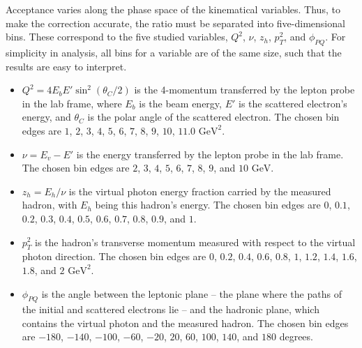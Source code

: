     Acceptance varies along the phase space of the kinematical variables.
    Thus, to make the correction accurate, the ratio must be separated into five-dimensional bins.
    These correspond to the five studied variables, $Q^2$, $\nu$, $z_h$, $p_T^2$, and $\phi_{PQ}$.
    For simplicity in analysis, all bins for a variable are of the same size, such that the results are easy to interpret.
    \begin{itemize}
        \item
            $Q^2 = 4E_bE'\sin^2(\theta_C/2)$ is the 4-momentum transferred by the lepton probe in the lab frame, where $E_b$ is the beam energy, $E'$ is the scattered electron's energy, and $\theta_C$ is the polar angle of the scattered electron.
            The chosen bin edges are $1$, $2$, $3$, $4$, $5$, $6$, $7$, $8$, $9$, $10$, $11.0$ $\text{GeV}^2$.
        \item
            $\nu = E_v - E'$ is the energy transferred by the lepton probe in the lab frame.
            The chosen bin edges are $2$, $3$, $4$, $5$, $6$, $7$, $8$, $9$, and $10$ $\text{GeV}$.
        \item
            $z_h = E_h/\nu$ is the virtual photon energy fraction carried by the measured hadron, with $E_h$ being this hadron's energy.
            The chosen bin edges are $0$, $0.1$, $0.2$, $0.3$, $0.4$, $0.5$, $0.6$, $0.7$, $0.8$, $0.9$, and $1$.
        \item
            $p_T^2$ is the hadron's transverse momentum measured with respect to the virtual photon direction.
            The chosen bin edges are $0$, $0.2$, $0.4$, $0.6$, $0.8$, $1$, $1.2$, $1.4$, $1.6$, $1.8$, and $2$ $\text{GeV}^2$.
        \item
            $\phi_{PQ}$ is the angle between the leptonic plane -- the plane where the paths of the initial and scattered electrons lie -- and the hadronic plane, which contains the virtual photon and the measured hadron.
            The chosen bin edges are $-180$, $-140$, $-100$, $-60$, $-20$, $20$, $60$, $100$, $140$, and $180$ degrees.
    \end{itemize}

